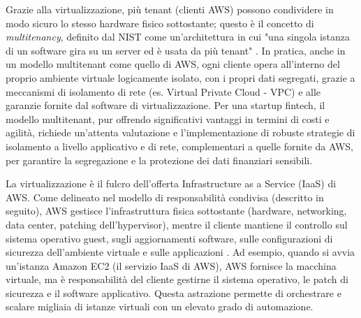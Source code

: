 Grazie alla virtualizzazione, più tenant (clienti AWS) possono condividere in modo sicuro lo stesso hardware fisico sottostante; questo è il concetto di \textit{multitenancy}, definito dal NIST come un'architettura in cui "una singola istanza di un software gira su un server ed è usata da più tenant" \cite{nist800-145}. In pratica, anche in un modello multitenant come quello di AWS, ogni cliente opera all'interno del proprio ambiente virtuale logicamente isolato, con i propri dati segregati, grazie a meccanismi di isolamento di rete (es. Virtual Private Cloud - VPC) e alle garanzie fornite dal software di virtualizzazione. Per una startup fintech, il modello multitenant, pur offrendo significativi vantaggi in termini di costi e agilità, richiede un'attenta valutazione e l'implementazione di robuste strategie di isolamento a livello applicativo e di rete, complementari a quelle fornite da AWS, per garantire la segregazione e la protezione dei dati finanziari sensibili.

La virtualizzazione è il fulcro dell'offerta Infrastructure as a Service (IaaS) di AWS. Come delineato nel modello di responsabilità condivisa (descritto in seguito), AWS gestisce l'infrastruttura fisica sottostante (hardware, networking, data center, patching dell'hypervisor), mentre il cliente mantiene il controllo sul sistema operativo guest, sugli aggiornamenti software, sulle configurazioni di sicurezza dell'ambiente virtuale e sulle applicazioni \cite{aws-well-architected}. Ad esempio, quando si avvia un'istanza Amazon EC2 (il servizio IaaS di AWS), AWS fornisce la macchina virtuale, ma è responsabilità del cliente gestirne il sistema operativo, le patch di sicurezza e il software applicativo. Questa astrazione permette di orchestrare e scalare migliaia di istanze virtuali con un elevato grado di automazione.

